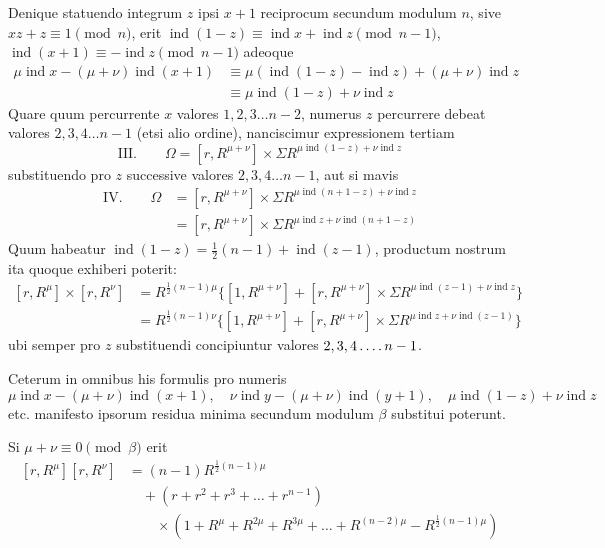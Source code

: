 Denique statuendo integrum $z$ ipsi $x+1$ reciprocum secundum 
%
modulum $n$, sive $xz+z\equiv1\pmod n$, erit $\operatorname{ind}(1-z)\equiv\operatorname{ind}x+\operatorname{ind}z\pmod{n-1}$, $\operatorname{ind}(x+1)\equiv-\operatorname{ind}z\pmod{n-1}$ adeoque
\[
\begin{aligned}
\mu\operatorname{ind}x-(\mu+\nu)\operatorname{ind}(x+1)&\equiv\mu(\operatorname{ind}(1-z)-\operatorname{ind}z)+(\mu+\nu)\operatorname{ind}z\\
&\equiv\mu\operatorname{ind}(1-z)+\nu\operatorname{ind}z
\end{aligned}
\]
Quare quum percurrente $x$ valores $1,2,3\dots n-2$, numerus $z$ percurrere debeat valores $2,3,4\dots n-1$ (etsi alio ordine), nanciscimur expressionem tertiam
\[
\text{III.}\qquad\Omega=[r,R^{\mu+\nu}]\times\Sigma R^{\mu\operatorname{ind}(1-z)+\nu\operatorname{ind}z}
\]
substituendo pro $z$ successive valores $2,3,4\dots n-1$, aut si mavis
\[
\begin{aligned}
\text{IV.}\qquad\Omega&=[r,R^{\mu+\nu}]\times\Sigma R^{\mu\operatorname{ind}(n+1-z)+\nu\operatorname{ind}z}\\
&=[r,R^{\mu+\nu}]\times\Sigma R^{\mu\operatorname{ind}z+\nu\operatorname{ind}(n+1-z)}
\end{aligned}
\]
Quum habeatur $\operatorname{ind}(1-z)=\frac12(n-1)+\operatorname{ind}(z-1)$, productum nostrum ita quoque exhiberi poterit:
\[
\begin{aligned}
[r,R^\mu]\times[r,R^\nu]&=R^{\frac12(n-1)\mu}\{[1,R^{\mu+\nu}]+[r,R^{\mu+\nu}]\times\Sigma R^{\mu\operatorname{ind}(z-1)+\nu\operatorname{ind}z}\}\\
&=R^{\frac12(n-1)\nu}\{[1,R^{\mu+\nu}]+[r,R^{\mu+\nu}]\times\Sigma R^{\mu\operatorname{ind}z+\nu\operatorname{ind}(z-1)}\}
\end{aligned}
\]
ubi semper pro $z$ substituendi concipiuntur valores $2,3,4\mathinner{.\,.\,.\,.} n-1$.

Ceterum in omnibus his formulis pro numeris
\[
\mu\operatorname{ind}x-(\mu+\nu)\operatorname{ind}(x+1),\quad\nu\operatorname{ind}y-(\mu+\nu)\operatorname{ind}(y+1),\quad\mu\operatorname{ind}(1-z)+\nu\operatorname{ind}z
\]
etc. manifesto ipsorum residua minima secundum modulum $\beta$ substitui poterunt.

Si $\mu+\nu\equiv0\pmod\beta$ erit
\[
\begin{aligned}
[r,R^\mu][r,R^\nu]&=(n-1)R^{\frac12(n-1)\mu}\\
&\quad+(r+r^2+r^3+\dots+r^{n-1})\\
&\qquad\times(1+R^\mu+R^{2\mu}+R^{3\mu}+\dots+R^{(n-2)\mu}-R^{\frac12(n-1)\mu})
\end{aligned}
\]


